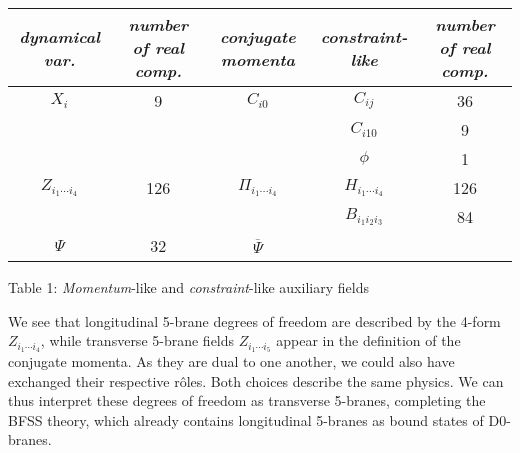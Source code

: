 \documentclass[a4paper,11pt]{article}
\begin{document}
\begin{center}
\begin{tabular}{c|c|c||c|c}
\emph{dynamical var.} & \emph{number of real comp.} & \emph{conjugate momenta} & \emph{
constraint-like} & \emph{number of real comp.} \\ \hline
$X_{i}$ & 9 & $C_{i0}$ & $C_{ij}$ & 36 \\ 
&  &  & $C_{i10}$ & 9 \\ 
&  &  & $\phi $ & 1 \\ \hline
$Z_{i_{1}\cdots i_{4}}$ & 126 & $\Pi _{i_{1}\cdots i_{4}}$ & $H_{i_{1}\cdots
i_{4}}$ & 126 \\ 
 & &  &  $B_{i_{1}i_{2}i_{3}}$ & 84 \\ 
\hline
$\displaystyle{\Psi}$ & 32  & $\displaystyle{\overline{\Psi }}$ &  &  \\ \hline
\end{tabular}\vspace{0.5cm}
Table 1: \textit{Momentum}-like and \textit{constraint}-like auxiliary fields
\end{center}
We see that longitudinal 5-brane degrees of freedom are described by the 4-form $Z_{i_{1}\cdots i_{4}}$, while 
transverse 5-brane fields $Z_{i_{1}\cdots i_{5}}$ appear in the definition of the conjugate momenta.  
As they are dual to one another, we could also have exchanged their respective r\^oles.
Both choices describe the same physics. We can thus interpret these degrees of freedom as transverse 5-branes, 
completing the BFSS theory, which already contains longitudinal 5-branes as bound states of D0-branes.  
                          
\end{document}
